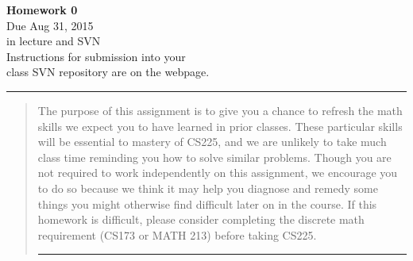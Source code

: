 \documentclass[11pt]{article}
\begin{document}

\begin{center}
\LARGE
\textbf{Homework 0}
\\[1ex]
\Large Due Aug 31, 2015 \\ in lecture and SVN \\ \large Instructions for submission into your \\ class SVN repository are on the webpage.
\end{center}

\bigskip\hrule
\begin{quote}
The purpose of this assignment is to give you  a chance to refresh the math
skills we expect you to have learned in prior classes.  These particular skills
will be essential to  mastery of CS225, and we are unlikely to take much class
time reminding you how to solve similar problems.  Though you are not required
to work independently on this assignment, we encourage you to do so because we
think it may help you diagnose and  remedy some things you might otherwise find
difficult later on in the course. If this homework is difficult, please consider
completing the discrete math requirement (CS173 or MATH 213) before taking CS225. 

\bigskip
\hrule %

\end{quote}
\end{document}
